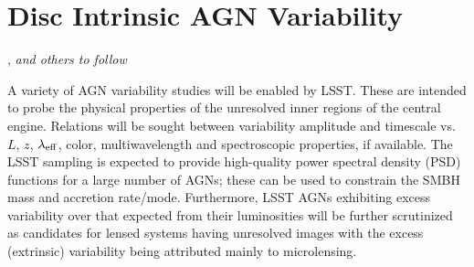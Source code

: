 %
%
%
%
%
%
%

\section{Disc Intrinsic AGN Variability}
\def\secname{\chpname:variability}\label{sec:\secname}

,
{\it and others to follow}



A variety of AGN variability studies will be
enabled by LSST. These are intended to probe the physical properties
of the unresolved inner regions of the central engine. Relations will
be sought between variability amplitude and timescale vs. $L$, $z$,
$\lambda_{\rm eff}$, color, multiwavelength and spectroscopic
properties, if available. The LSST sampling is expected to provide
high-quality power spectral density (PSD) functions for a large number
of AGNs; these can be used to constrain the SMBH mass and accretion
rate/mode. Furthermore, LSST AGNs exhibiting excess variability over
that expected from their luminosities will be further scrutinized as
candidates for lensed systems having unresolved images with the excess
(extrinsic) variability being attributed mainly to microlensing.

